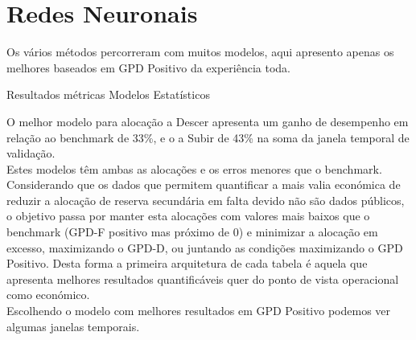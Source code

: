 \section{Redes Neuronais \label{se:resml}}

Os vários métodos percorreram com muitos modelos, aqui apresento apenas os melhores baseados em GPD Positivo da experiência toda.\\


\begin{table}[H]
    \caption{Resultados métricas Modelos Estatísticos}    
    \resizebox{\linewidth}{!}{}
    \label{tab:mlresmetrics}
    \end{table}

O melhor modelo para alocação a Descer apresenta um ganho de desempenho em relação ao benchmark de 33\%, e o a Subir de 43\% na soma da janela temporal de validação.\\
Estes modelos têm ambas as alocações e os erros menores que o benchmark. Considerando que os dados que permitem quantificar a mais valia económica de reduzir a alocação de reserva secundária em falta devido não são dados públicos, o objetivo passa por manter esta alocações com valores mais baixos que o benchmark (GPD-F positivo mas próximo de 0) e minimizar a alocação em excesso, maximizando o GPD-D, ou juntando as condições maximizando o GPD Positivo. Desta forma a primeira arquitetura de cada tabela é aquela que apresenta melhores resultados quantificáveis quer do ponto de vista operacional como económico.\\
Escolhendo o modelo com melhores resultados em GPD Positivo podemos ver algumas janelas temporais.\\


